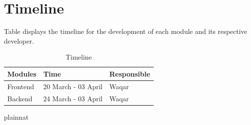 \documentclass[12pt, titlepage]{article}
\begin{document}
\section{Timeline}


Table displays the timeline for the development of each module and its respective developer.

\begin{table}[H]
\centering
\begin{tabular}{p{} p{}  p{}}
\toprule
 \textbf{Modules} & \textbf{Time} & \textbf{Responsible} \\
\midrule
Frontend& 20 March - 03 April & Waqar\\
Backend & 24 March - 03 April & Waqar\\
\bottomrule
\end{tabular}
\caption{Timeline}
\end{table}

 {plainnat}


\newpage{}
\end{document}

